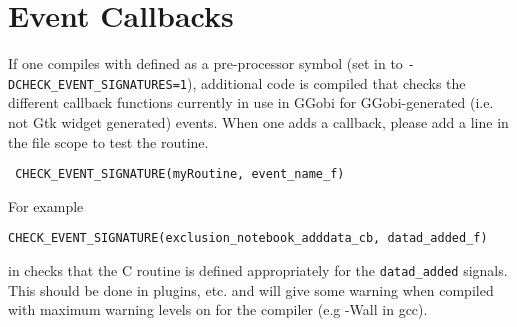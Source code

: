 \documentclass{article}
\begin{document}
\section{Event Callbacks}
If one compiles with  defined as a
pre-processor symbol (set  in
 to \texttt{-DCHECK_EVENT_SIGNATURES=1}),
additional code is compiled that checks the different callback
functions currently in use in GGobi for GGobi-generated (i.e. not Gtk
widget generated) events.
When one adds a callback, please add
a line in the file scope to test the routine.
\begin{verbatim}
 CHECK_EVENT_SIGNATURE(myRoutine, event_name_f)
\end{verbatim}
For example 
\begin{verbatim}
CHECK_EVENT_SIGNATURE(exclusion_notebook_adddata_cb, datad_added_f)
\end{verbatim}
in  checks that the C routine
 is defined appropriately for
the \texttt{datad_added} signals.  This should be done in plugins,
etc.  and will give some warning when compiled with maximum warning
levels on for the compiler (e.g -Wall in gcc).
\end{document}
